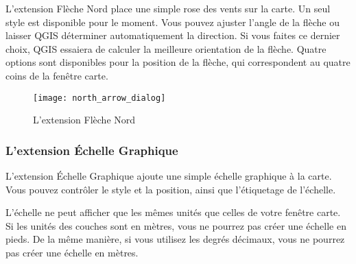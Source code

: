 L'extension Flèche Nord place une simple rose des vents sur la carte. Un seul
style est disponible pour le moment. Vous pouvez ajuster l'angle de la flèche 
ou laisser QGIS déterminer automatiquement la direction. Si vous faites ce 
dernier choix, QGIS essaiera de calculer la meilleure orientation de la flèche.
Quatre options sont disponibles pour la position de la flèche, qui correspondent
au quatre coins de la fenêtre carte.

\begin{figure}[ht]
   \begin{center}
   \caption{L'extension Flèche Nord \nixcaption}\label{fig:north_arrow}\smallskip
   \texttt{[image: north\_arrow\_dialog]}
\end{center}  
\end{figure}

\subsubsection{L'extension Échelle Graphique}
L'extension Échelle Graphique ajoute une simple échelle graphique à la carte.
Vous pouvez contrôler le style et la position, ainsi que l'étiquetage de l'échelle.

L'échelle ne peut afficher que les mêmes unités que celles de votre fenêtre carte.
Si les unités des couches sont en mètres, vous ne pourrez pas créer une échelle en
pieds. De la même manière, si vous utilisez les degrés décimaux, vous ne pourrez 
pas créer une échelle en mètres.

